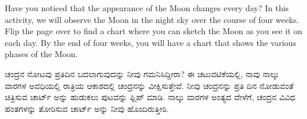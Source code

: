 \documentclass[a4paper,12pt,landscape]{article}
\newcommand{\kn}[1]{{\kannadafont #1}}
\begin{document}
\thispagestyle{empty}
\begin{figure}
    \centering
\end{figure}
\newpage
\centering
\begin{minipage}{0.8\textwidth}
    \vspace{3cm}
    \Large
    Have you noticed that the appearance of the Moon changes every day? In this activity, we will observe the Moon in the night sky over the course of four weeks. Flip the page over to find a chart where you can sketch the Moon as you see it on each day. By the end of four weeks, you will have a chart that shows the various phases of the Moon.
\end{minipage}
\centering
\begin{minipage}{0.8\textwidth}
    \vspace{3cm}
    \Large
    \kn{ಚಂದ್ರನ ನೋಟವು ಪ್ರತಿದಿನ ಬದಲಾಗುವುದನ್ನು ನೀವು ಗಮನಿಸಿದ್ದೀರಾ? ಈ ಚಟುವಟಿಕೆಯಲ್ಲಿ, ನಾವು ನಾಲ್ಕು ವಾರಗಳ ಅವಧಿಯಲ್ಲಿ ರಾತ್ರಿಯ ಆಕಾಶದಲ್ಲಿ ಚಂದ್ರನನ್ನು ವೀಕ್ಷಿಸುತ್ತೇವೆ. ನೀವು ಚಂದ್ರನನ್ನು ಪ್ರತಿ ದಿನ ನೋಡುವಂತೆ ಚಿತ್ರಿಸುವ ಚಾರ್ಟ್ ಅನ್ನು ಹುಡುಕಲು ಪುಟವನ್ನು ಫ್ಲಿಪ್ ಮಾಡಿ. ನಾಲ್ಕು ವಾರಗಳ ಅಂತ್ಯದ ವೇಳೆಗೆ, ಚಂದ್ರನ ವಿವಿಧ ಹಂತಗಳನ್ನು ತೋರಿಸುವ ಚಾರ್ಟ್ ಅನ್ನು ನೀವು ಹೊಂದಿರುತ್ತೀರಿ.}
\end{minipage}
\end{document}
